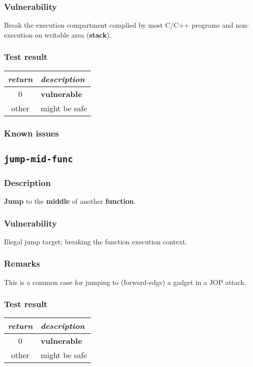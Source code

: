 \documentclass[a4paper]{book}
\begin{document}
\subsubsection{Vulnerability}
Break the execution compartment complied by most C/C++ programs and non-execution on writable area (\textbf{stack}).

\subsubsection{Test result}
\begin{tabular}{cl}
  \toprule
  \emph{return}  & \emph{description} \\
  \midrule
  0              & \textbf{vulnerable} \\
  other          & might be safe \\
  \bottomrule
\end{tabular}
  
\subsubsection{Known issues}

\newpage
\subsection{\texttt{jump-mid-func}}\label{test-jump-mid-func}

\subsubsection{Description}
\textbf{Jump} to the \textbf{middle} of another \textbf{function}.

\subsubsection{Vulnerability}
Illegal jump target; breaking the function execution context.

\subsubsection{Remarks}
This is a common case for jumping to (forward-edge) a gadget in a JOP attack.

\subsubsection{Test result}
\begin{tabular}{cl}
  \toprule
  \emph{return}  & \emph{description} \\
  \midrule
  0              & \textbf{vulnerable} \\
  other          & might be safe \\
  \bottomrule
\end{tabular}
  
\end{document}

